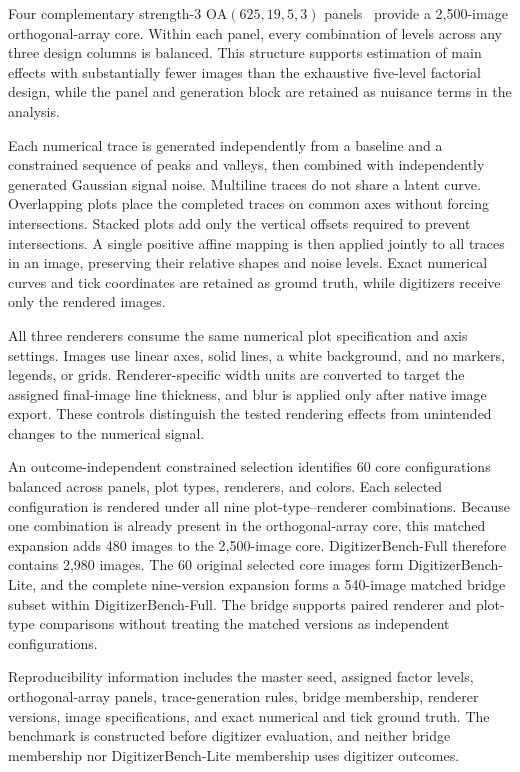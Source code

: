 \documentclass{article}
\begin{document}
Four complementary strength-3 $\mathrm{OA}(625,19,5,3)$ panels~\cite{hedayat1999orthogonal} provide a 2,500-image orthogonal-array core. Within each panel, every combination of levels across any three design columns is balanced. This structure supports estimation of main effects with substantially fewer images than the exhaustive five-level factorial design, while the panel and generation block are retained as nuisance terms in the analysis.

Each numerical trace is generated independently from a baseline and a constrained sequence of peaks and valleys, then combined with independently generated Gaussian signal noise. Multiline traces do not share a latent curve. Overlapping plots place the completed traces on common axes without forcing intersections. Stacked plots add only the vertical offsets required to prevent intersections. A single positive affine mapping is then applied jointly to all traces in an image, preserving their relative shapes and noise levels. Exact numerical curves and tick coordinates are retained as ground truth, while digitizers receive only the rendered images.

All three renderers consume the same numerical plot specification and axis settings. Images use linear axes, solid lines, a white background, and no markers, legends, or grids. Renderer-specific width units are converted to target the assigned final-image line thickness, and blur is applied only after native image export. These controls distinguish the tested rendering effects from unintended changes to the numerical signal.

An outcome-independent constrained selection identifies 60 core configurations balanced across panels, plot types, renderers, and colors. Each selected configuration is rendered under all nine plot-type--renderer combinations. Because one combination is already present in the orthogonal-array core, this matched expansion adds 480 images to the 2,500-image core. DigitizerBench-Full therefore contains 2,980 images. The 60 original selected core images form DigitizerBench-Lite, and the complete nine-version expansion forms a 540-image matched bridge subset within DigitizerBench-Full. The bridge supports paired renderer and plot-type comparisons without treating the matched versions as independent configurations.

Reproducibility information includes the master seed, assigned factor levels, orthogonal-array panels, trace-generation rules, bridge membership, renderer versions, image specifications, and exact numerical and tick ground truth. The benchmark is constructed before digitizer evaluation, and neither bridge membership nor DigitizerBench-Lite membership uses digitizer outcomes.
\end{document}
